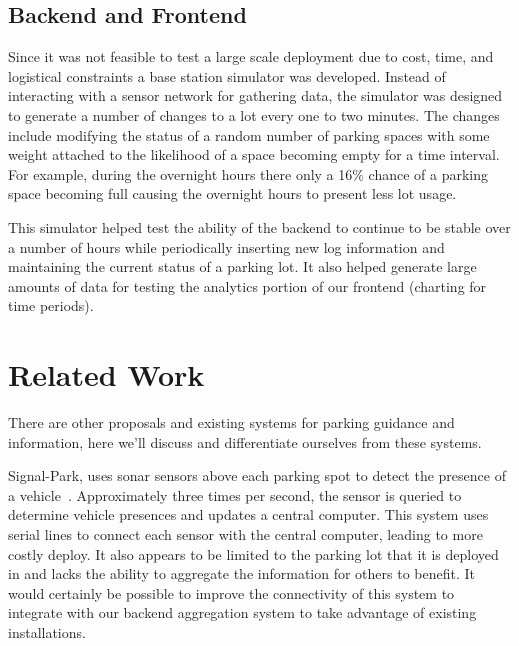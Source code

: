 \documentclass{acm_proc}
\begin{document}
\subsection{Backend and Frontend}

Since it was not feasible to test a large scale deployment due to cost,
time, and logistical constraints a base station simulator was developed.
Instead of interacting with a sensor network for gathering data, the
simulator was designed to generate a number of changes to a lot every one
to two minutes.
The  changes include modifying the status of a random number of parking
spaces with some weight attached to the likelihood of a space becoming empty
for a time interval.
For example, during the overnight hours there only a 16\% chance of a
parking space becoming full causing the overnight hours to present less lot
usage.

This simulator helped test the ability of the backend to continue to be
stable over a number of hours while periodically inserting new log
information and maintaining the current status of a parking lot.
It also helped generate large amounts of data for testing the analytics
portion of our frontend (charting for time periods).

\section{Related Work}\label{sec:related}

There are other proposals and existing systems for parking guidance and
information, here we'll discuss and differentiate ourselves from these
systems.

Signal-Park, uses sonar sensors above each parking spot to detect the
presence of a vehicle~\cite{pgi:signal-park}.
Approximately three times per second, the sensor is queried to determine
vehicle presences and updates a central computer.
This system uses serial lines to connect each sensor with the central
computer, leading to more costly deploy.
It also appears to be limited to the parking lot that it is deployed in and
lacks the ability to aggregate the information for others to benefit.
It would certainly be possible to improve the connectivity of this system
to integrate with our backend aggregation system to take advantage of
existing installations.
\end{document}
